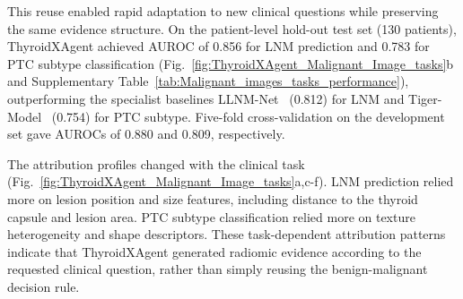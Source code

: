 \documentclass[fleqn,10pt]{wlscirep}
\begin{document}
This reuse enabled rapid adaptation to new clinical questions while preserving the same evidence structure. On the patient-level hold-out test set (130 patients), ThyroidXAgent achieved AUROC of 0.856 for LNM prediction and 0.783 for PTC subtype classification (Fig.~\ref{fig:ThyroidXAgent_Malignant_Image_tasks}b and Supplementary Table~\ref{tab:Malignant_images_tasks_performance}), outperforming the specialist baselines LLNM-Net~\cite{Shen2025NatCommunLLNM} (0.812) for LNM and Tiger-Model~\cite{Dai2025NatCommunThyroidSubtype} (0.754) for PTC subtype. Five-fold cross-validation on the development set gave AUROCs of 0.880 and 0.809, respectively.

The attribution profiles changed with the clinical task (Fig.~\ref{fig:ThyroidXAgent_Malignant_Image_tasks}a,c-f). LNM prediction relied more on lesion position and size features, including distance to the thyroid capsule and lesion area. PTC subtype classification relied more on texture heterogeneity and shape descriptors. These task-dependent attribution patterns indicate that ThyroidXAgent generated radiomic evidence according to the requested clinical question, rather than simply reusing the benign-malignant decision rule.
\end{document}
